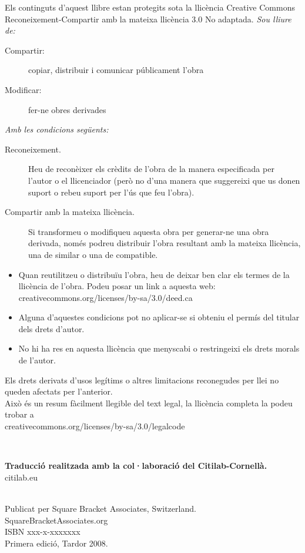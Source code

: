 \documentclass[a4paper,10pt,twoside]{book}
\begin{document}
\begin{footnotesize}
Els continguts d'aquest llibre estan protegits sota la llicència Creative Commons
Reconeixement-Compartir amb la mateixa llicència 3.0 No adaptada.
\newline
\newline
\emph{Sou lliure de:}
\begin{description}
  \item[Compartir: ] copiar, distribuir i comunicar públicament l'obra
  \item[Modificar: ]fer-ne obres derivades
\end{description}
\emph{Amb les condicions següents:}
\begin{description}
  \item[Reconeixement.] Heu de reconèixer els crèdits de l'obra de la manera especificada per l'autor o el llicenciador (però no d'una manera que suggereixi que us donen suport o rebeu suport per l'ús que feu l'obra).
  \item[Compartir amb la mateixa llicència. ] Si transformeu o modifiqueu aquesta obra per generar-ne una obra derivada, només podreu distribuir l'obra resultant amb la mateixa llicència, una de similar o una de compatible.
  \end{description}
\begin{itemize}
  \item Quan reutilitzeu o distribuïu l'obra, heu de deixar ben clar els termes de la llicència de l'obra. Podeu posar un link a aquesta web:
  \textsf{creativecommons.org/licenses/by-sa/3.0/deed.ca}
  \item Alguna d'aquestes condicions pot no aplicar-se si obteniu el permís del titular dels drets d'autor.
  \item No hi ha res en aquesta llicència que menyscabi o restringeixi els drets morals de l'autor.
\end{itemize}
\quad
\parbox{15cm}{
Els drets derivats d'usos legítims o altres limitacions reconegudes per llei no queden afectats per l'anterior.\\
Això és un resum fàcilment llegible del text legal, la llicència completa la podeu trobar a\\
\textsf{creativecommons.org/licenses/by-sa/3.0/legalcode}}\\[1cm]

\quad
\parbox{15cm}{
	\textbf{\small Traducció realitzada amb la col·laboració del Citilab-Cornellà.}\\
	\textsf{citilab.eu}}\\[1cm]


Publicat per Square Bracket Associates, Switzerland. \textsf{SquareBracketAssociates.org}\\
ISBN xxx-x-xxxxxxx\\
Primera edició, Tardor 2008.
\end{footnotesize}
\end{document}
